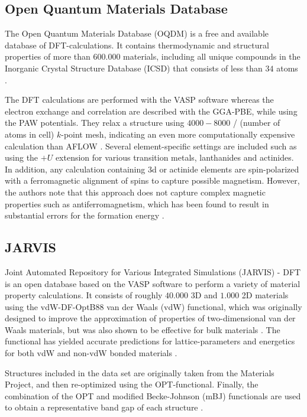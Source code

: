 \subsection{Open Quantum Materials Database}

The Open Quantum Materials Database (OQDM) \cite{Saal2013, Kirklin2015} is a free and available database of DFT-calculations. It contains thermodynamic and structural properties of more than $600.000$ materials, including all unique compounds in the Inorganic Crystal Structure Database (ICSD) that consists of less than $34$ atoms \cite{Ferrenti2020}.

The DFT calculations are performed with the VASP software whereas the electron exchange and correlation are described with the GGA-PBE, while using the PAW potentials. They relax a structure using $4000-8000$ / (number of atoms in cell) $k$-point mesh, indicating an even more computationally expensive calculation than AFLOW \cite{Ferrenti2020}. Several element-specific settings are included such as using the $+U$ extension for various transition metals, lanthanides and actinides. In addition, any calculation containing 3d or actinide elements are spin-polarized with a ferromagnetic alignment of spins to capture possible magnetism. However, the authors note that this approach does not capture complex magnetic properties such as antiferromagnetism, which has been found to result in substantial errors for the formation energy \cite{Stevanovic2012}.

\subsection{JARVIS}

Joint Automated Repository for Various Integrated Simulations (JARVIS) - DFT \cite{Choudhary2020} is an open database based on the VASP \cite{Kresse1996} software to perform a variety of material property calculations. It consists of roughly $40.000$ 3D and $1.000$ 2D materials using the vdW-DF-OptB88 van der Waals (vdW) functional, which was originally designed to improve the approximation of properties of two-dimensional van der Waals materials, but was also shown to be effective for bulk materials \cite{Thonhauser2007, Klimes2011}. The functional has yielded accurate predictions for lattice-parameters and energetics for both vdW and non-vdW bonded materials  \cite{Choudhary2018}.

Structures included in the data set are originally taken from the Materials Project, and then re-optimized using the OPT-functional. Finally, the combination of the OPT and modified Becke-Johnson (mBJ) functionals are used to obtain a representative band gap of each structure \cite{Choudhary2018a}. %

